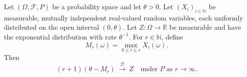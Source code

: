 \begin{theorem}
Let $(\Omega,\mathcal F,P)$ be a probability space and let $\theta>0$.
Let $(X_i)_{i\in\mathbb N}$ be measurable, mutually independent real-valued
random variables, each uniformly distributed on the open interval
$(0,\theta)$. Let $Z:\Omega\to\mathbb R$ be measurable and have the
exponential distribution with rate $\theta^{-1}$. For $r\in\mathbb N$,
define
\[
 M_r(\omega)=\max_{0\leq i\leq r}X_i(\omega).
\]
Then
\[
 (r+1)(\theta-M_r)\ \xrightarrow{\mathcal D}\ Z
 \quad\text{under }P\text{ as }r\to\infty.
\]
\end{theorem}
